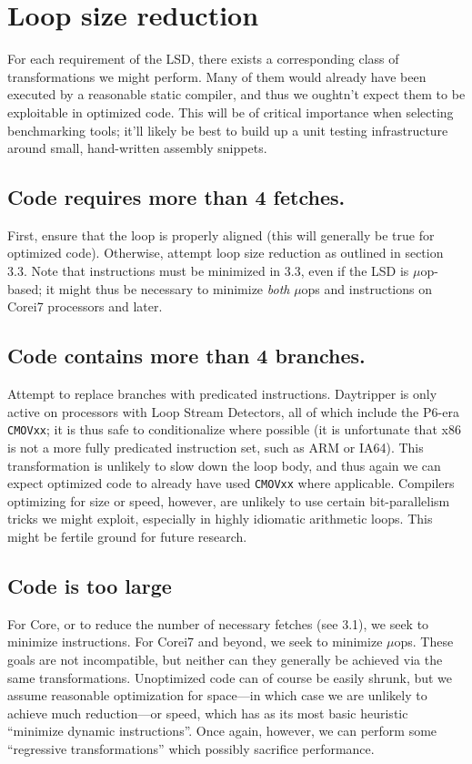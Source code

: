 \documentclass[]{sigplanconf}
\begin{document}
\section{Loop size reduction}

For each requirement of the LSD, there exists a corresponding class of
transformations we might perform. Many of them would already have been
executed by a reasonable static compiler, and thus we oughtn't expect them
to be exploitable in optimized code. This will be of critical importance
when selecting benchmarking tools; it'll likely be best to build up a unit
testing infrastructure around small, hand-written assembly snippets.

\subsection{Code requires more than 4 fetches.} First, ensure that the loop is
properly aligned (this will generally be true for optimized code). Otherwise,
attempt loop size reduction as outlined in section 3.3. Note that instructions
must be minimized in 3.3, even if the LSD is $\mu$op-based; it might thus be
necessary to minimize \textit{both} $\mu$ops and instructions on Core\texttrademark i7
processors and later.

\subsection{Code contains more than 4 branches.} Attempt to replace branches with
predicated instructions. Daytripper is only active on processors with Loop
Stream Detectors, all of which include the P6-era \texttt{CMOVxx}; it is thus
safe to conditionalize where possible (it is unfortunate that x86 is not a more
fully predicated instruction set, such as ARM \cite{seal} or IA64). This transformation is
unlikely to slow down the loop body, and thus again we can expect optimized
code to already have used \texttt{CMOVxx} where applicable. Compilers
optimizing for size or speed, however, are unlikely to use certain
bit-parallelism tricks \cite{warren} we might exploit, especially in highly
idiomatic arithmetic loops. This might be fertile ground for future research.

\subsection{Code is too large} For Core, or to reduce the number
of necessary fetches (see 3.1), we seek to minimize instructions. For Core\texttrademark i7
and beyond, we seek to minimize $\mu$ops. These goals are not incompatible,
but neither can they generally be achieved via the same transformations.
Unoptimized code can of course be easily shrunk, but we assume reasonable
optimization for space---in which case we are unlikely to achieve much
reduction---or speed, which has as its most basic heuristic ``minimize dynamic
instructions''. Once again, however, we can perform some ``regressive transformations''
which possibly sacrifice performance.
\end{document}
